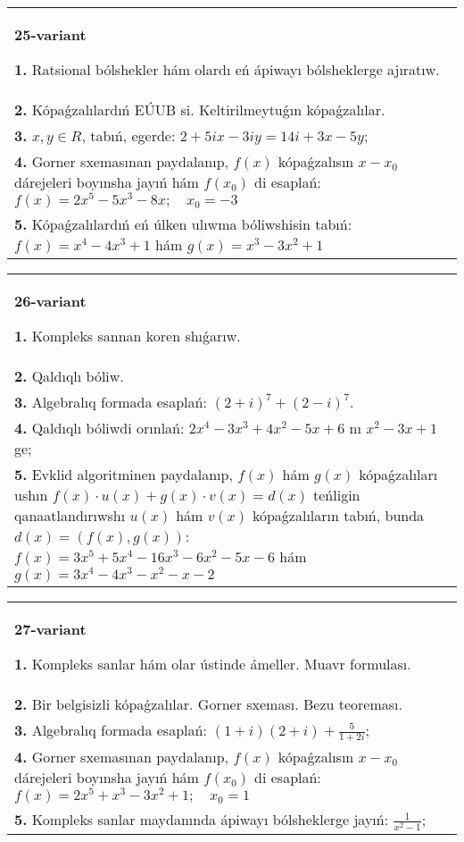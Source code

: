 \documentclass{article}
\begin{document}
\begin{tabular}{m{17cm}}
\textbf{25-variant}
\newline

\textbf{1.} Ratsional bólshekler hám olardı eń ápiwayı bólsheklerge ajıratıw. \\
\textbf{2.} Kópaǵzalılardıń EÚUB si. Keltirilmeytuǵın   kópaǵzalılar. \\
\textbf{3.}  $x, y \in R$, tabıń, egerde: $2+5 i x-3 i y=14 i+3 x-5 y$; \\
\textbf{4.} Gorner sxemasınan paydalanıp, $f(x)$ kópaǵzalısın $x-x_0$ dárejeleri boyınsha jayıń hám $f\left(x_0\right)$ di esaplań: $f(x)=2 x^5-5 x^3-8 x ; \quad x_0=-3$ \\
\textbf{5.} Kópaǵzalılardıń eń úlken ulıwma bóliwshisin tabıń:  $f(x)=x^4-4 x^3+1$ hám $g(x)=x^3-3 x^2+1$ \\

\end{tabular}
\vspace{1cm}


\begin{tabular}{m{17cm}}
\textbf{26-variant}
\newline

\textbf{1.} Kompleks sannan koren shıǵarıw. \\
\textbf{2.} Qaldıqlı bóliw.  \\
\textbf{3.} Algebralıq formada esaplań: $(2+i)^7+(2-i)^7$. \\
\textbf{4.} Qaldıqlı bóliwdi orınlań: $2 x^4-3 x^3+4 x^2-5 x+6$ nı $x^2-3 x+1$ ge; \\
\textbf{5.} Evklid algoritminen paydalanıp, $f(x)$ hám $g(x)$ kópaǵzalıları ushın $f(x) \cdot u(x)+g(x) \cdot v(x)=d(x)$ teńligin qanaatlandırıwshı $u(x)$ hám $v(x)$ kópaǵzalıların tabıń, bunda $d(x)=(f(x), g(x))$:  $f(x)=3 x^5+5 x^4-16 x^3-6 x^2-5 x-6$ hám $g(x)=3 x^4-4 x^3-x^2-x-2$ \\

\end{tabular}
\vspace{1cm}


\begin{tabular}{m{17cm}}
\textbf{27-variant}
\newline

\textbf{1.} Kompleks sanlar hám olar ústinde ámeller. Muavr formulası.  \\
\textbf{2.} Bir belgisizli kópaǵzalılar. Gorner sxeması. Bezu teoreması.  \\
\textbf{3.} Algebralıq formada esaplań:  $(1+i)(2+i)+\frac{5}{1+2 i}$; \\
\textbf{4.} Gorner sxemasınan paydalanıp, $f(x)$ kópaǵzalısın $x-x_0$ dárejeleri boyınsha jayıń hám $f\left(x_0\right)$ di esaplań:  $f(x)=2 x^5+x^3-3 x^2+1 ; \quad x_0=1$ \\
\textbf{5.} Kompleks sanlar maydanında ápiwayı bólsheklerge jayıń: $\frac{1}{x^2-1}$; \\

\end{tabular}
\vspace{1cm}
\end{document}
